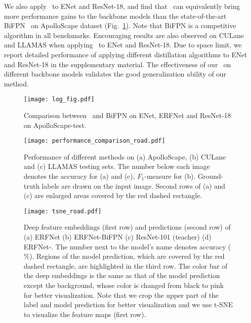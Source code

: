 \documentclass[10pt,twocolumn,letterpaper]{article}
\begin{document}
We also apply \algorithmname~to ENet and ResNet-18, and find that \algorithmname~can equivalently bring more performance gains to the backbone models than the state-of-the-art BiFPN~\cite{zhu2018bidirectional} on ApolloScape dataset (Fig.~\ref{fig:log}). Note that BiFPN is a competitive algorithm in all benchmarks. Encouraging results are also observed on CULane and LLAMAS when applying \algorithmname~to ENet and ResNet-18. Due to space limit, we report detailed performance of applying different distillation algorithms to ENet and ResNet-18 in the supplementary material. The effectiveness of our \algorithmname~on different backbone models validates the good generalization ability of our method.   


\begin{figure}[t]
  \centering
  \texttt{[image: log\_fig.pdf]}
  \vskip -0.2cm
  \caption{Comparison between \algorithmname~and BiFPN on ENet, ERFNet and ResNet-18 on ApolloScape-test.}
  \centering
  \vskip -0.2cm
  \label{fig:log}
\end{figure}

\begin{figure}[t]
  \centering
  \texttt{[image: performance\_comparison\_road.pdf]}
  \vskip -0.1cm
  \caption{Performance of different methods on (a) ApolloScape, (b) CULane and (c) LLAMAS testing sets. The number below each image denotes the accuracy for (a) and (c), $F_{1}$-measure for (b). Ground-truth labels are drawn on the input image. Second rows of (a) and (c) are enlarged areas covered by the red dashed rectangle.}
  \centering
  \vskip -0.6cm
  \label{fig:qualitative_result}
\end{figure}

\begin{figure*}[t]
  \centering
  \texttt{[image: tsne\_road.pdf]}
  \vskip -0.2cm
  \caption{Deep feature embeddings (first row) and predictions (second row) of (a) ERFNet (b) ERFNet-BiFPN (c) ResNet-101 (teacher) (d) ERFNet-\algorithmname. The number next to the model's name denotes accuracy ($\%$). Regions of the model prediction, which are covered by the red dashed rectangle, are highlighted in the third row. The color bar of the deep embeddings is the same as that of the model prediction except the background, whose color is changed from black to pink for better visualization. Note that we crop the upper part of the label and model prediction for better visualization and we use t-SNE to visualize the feature maps (first row).}
  \centering
  \vskip -0.4cm
  \label{fig:tsne_map}
\end{figure*}
\end{document}
